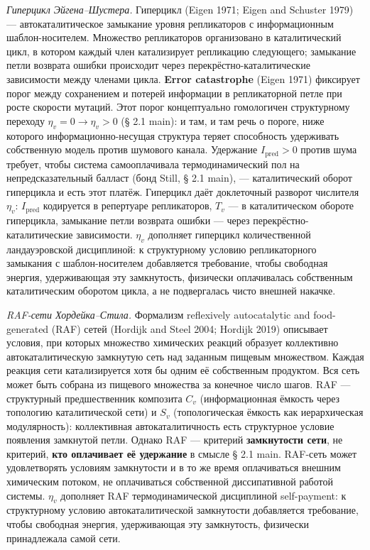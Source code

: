 \documentclass[pdflatex,sn-mathphys-ay]{sn-jnl}
\begin{document}
\emph{Гиперцикл Эйгена--Шустера.} Гиперцикл (Eigen 1971; Eigen and Schuster 1979) --- автокаталитическое замыкание уровня репликаторов с информационным шаблон-носителем. Множество репликаторов организовано в каталитический цикл, в котором каждый член катализирует репликацию следующего; замыкание петли возврата ошибки происходит через перекрёстно-каталитические зависимости между членами цикла. \textbf{Error catastrophe} (Eigen 1971) фиксирует порог между сохранением и потерей информации в репликаторной петле при росте скорости мутаций. Этот порог концептуально гомологичен структурному переходу \(\eta_v = 0 \to \eta_v > 0\) (§ 2.1 main): и там, и там речь о пороге, ниже которого информационно-несущая структура теряет способность удерживать собственную модель против шумового канала. Удержание \(I_{\text{pred}} > 0\) против шума требует, чтобы система самооплачивала термодинамический пол на непредсказательный балласт (бонд Still, § 2.1 main), --- каталитический оборот гиперцикла и есть этот платёж. Гиперцикл даёт доклеточный разворот числителя \(\eta_v\): \(I_{\text{pred}}\) кодируется в репертуаре репликаторов, \(T_v\) --- в каталитическом обороте гиперцикла, замыкание петли возврата ошибки --- через перекрёстно-каталитические зависимости. \(\eta_v\) дополняет гиперцикл количественной ландауэровской дисциплиной: к структурному условию репликаторного замыкания с шаблон-носителем добавляется требование, чтобы свободная энергия, удерживающая эту замкнутость, физически оплачивалась собственным каталитическим оборотом цикла, а не подвергалась чисто внешней накачке.

\emph{RAF-сети Хордейка--Стила.} Формализм reflexively autocatalytic and food-generated (RAF) сетей (Hordijk and Steel 2004; Hordijk 2019) описывает условия, при которых множество химических реакций образует коллективно автокаталитическую замкнутую сеть над заданным пищевым множеством. Каждая реакция сети катализируется хотя бы одним её собственным продуктом. Вся сеть может быть собрана из пищевого множества за конечное число шагов. RAF --- структурный предшественник композита \(C_v\) (информационная ёмкость через топологию каталитической сети) и \(S_v\) (топологическая ёмкость как иерархическая модулярность): коллективная автокаталитичность есть структурное условие появления замкнутой петли. Однако RAF --- критерий \textbf{замкнутости сети}, не критерий, \textbf{кто оплачивает её удержание} в смысле § 2.1 main. RAF-сеть может удовлетворять условиям замкнутости и в то же время оплачиваться внешним химическим потоком, не оплачиваться собственной диссипативной работой системы. \(\eta_v\) дополняет RAF термодинамической дисциплиной self-payment: к структурному условию автокаталитической замкнутости добавляется требование, чтобы свободная энергия, удерживающая эту замкнутость, физически принадлежала самой сети.
\end{document}
